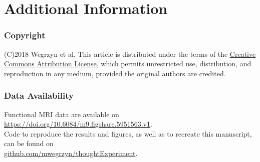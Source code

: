 \documentclass[fleqn,10pt]{SelfArx} %
\begin{document}

\section*{Additional Information}

\subsubsection*{Copyright}
(C)2018 Wegrzyn et al. This article is distributed under the terms of the \href{http://creativecommons.org/licenses/by/4.0/}{Creative Commons Attribution License}, which permits unrestricted use, distribution, and reproduction in any medium, provided the original authors are credited.  

\subsubsection*{Data Availability}   

Functional MRI data are available on  \\
\href{https://doi.org/10.6084/m9.figshare.5951563.v1}{https://doi.org/10.6084/m9.figshare.5951563.v1}.  \\
Code to reproduce the results and figures, as well as to recreate this manuscript, can be found on  \\
\href{https://github.com/mwegrzyn/thoughtExperiment}{github.com/mwegrzyn/thoughtExperiment}.  




\renewcommand*{\bibfont}{\footnotesize}



\end{document}
